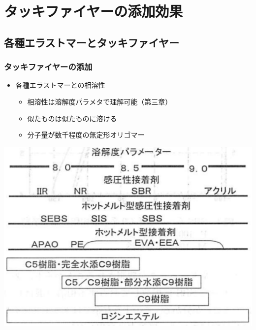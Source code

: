 \documentclass[12pt, dvipdfmx]{beamer}
\begin{document}
\section{タッキファイヤーの添加効果}

\subsection{各種エラストマーとタッキファイヤー}
\begin{frame}
	\frametitle{タッキファイヤーの添加}
	\begin{itemize}
		\item 各種エラストマーとの相溶性
		\begin{itemize}
			\item 相溶性は溶解度パラメタで理解可能（第三章）
			\item 似たものは似たものに溶ける
			\item \alert{分子量が数千程度}の無定形オリゴマー
		\end{itemize}
	\end{itemize}
	\vspace{3mm}
				\centering
					\includegraphics[width=.6\textwidth]{souyousei.png}
\end{frame}
\end{document}
